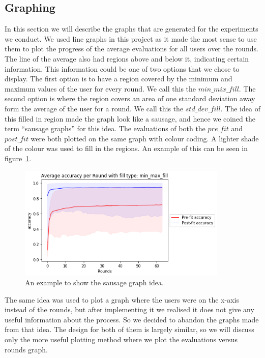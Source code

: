 \documentclass[12pt]{article}
\begin{document}
\subsection{Graphing}\label{subsec:graphing}
In this section we will describe the graphs that are generated for the experiments we conduct. We used line graphs in this project as it made the most sense to use them to plot the progress of the average evaluations for all users over the rounds. The line of the average also had regions above and below it, indicating certain information. This information could be one of two options that we chose to display. The first option is to have a region covered by the minimum and maximum values of the user for every round. We call this the $min\_mix\_fill$. The second option is where the region covers an area of one standard deviation away form the average of the user for a round. We call this the $std\_dev\_fill$. The idea of this filled in region made the graph look like a sausage, and hence we coined the term ``sausage graphs'' for this idea. The evaluations of both the $pre\_fit$ and $post\_fit$ were both plotted on the same graph with colour coding. A lighter shade of the colour was used to fill in the regions. An example of this can be seen in figure~\ref{fig:sample_graph}.
\begin{figure}[H]
	\centering
	\includegraphics[width=10cm]{resources/sample_graph.png}
	\caption{An example to show the sausage graph idea.}
	\label{fig:sample_graph}
\end{figure}
\noindent The same idea was used to plot a graph where the users were on the x-axis instead of the rounds, but after implementing it we realised it does not give any useful information about the process. So we decided to abandon the graphs made from that idea. The design for both of them is largely similar, so we will discuss only the more useful plotting method where we plot the evaluations versus rounds graph. 
\\\\
\end{document}
